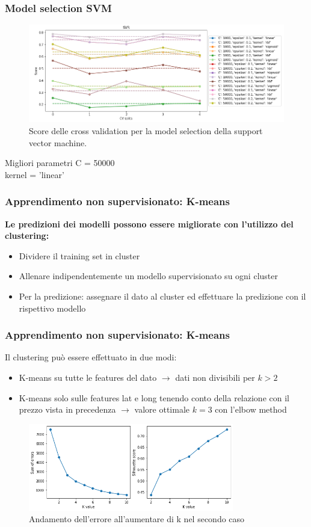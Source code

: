 \documentclass{beamer}
\begin{document}
\begin{frame}
	\frametitle{Model selection SVM}
	\begin{figure}[ht]
		\centering
		\includegraphics[width=\textwidth]{svmcv.png}
		\caption{Score delle cross validation per la model selection della support
		vector machine.}
	\end{figure}
	\begin{alertblock}{Migliori parametri}
		C = 50000\\
		kernel = 'linear'
	\end{alertblock}
\end{frame}

\begin{frame}
	\frametitle{Apprendimento non supervisionato: K-means}
	\textbf{Le predizioni dei modelli possono essere migliorate con l'utilizzo
	del clustering:}
	\begin{itemize}
		\item Dividere il training set in cluster
		\item Allenare indipendentemente un modello supervisionato su ogni cluster
		\item Per la predizione: assegnare il dato al cluster ed effettuare la
			predizione con il rispettivo modello
	\end{itemize}
\end{frame}

\begin{frame}
	\frametitle{Apprendimento non supervisionato: K-means}
	Il clustering può essere effettuato in due modi:
	\begin{itemize}
		\item K-means su tutte le features del dato $\rightarrow$ dati non 
			divisibili per $k > 2$
		\item K-means solo sulle features \alert{lat} e \alert{long} tenendo
			conto della relazione con il prezzo vista in precedenza
			$\rightarrow$ valore ottimale $k = 3$ con l'elbow method
	\end{itemize}
	\begin{figure}
		\centering
		\includegraphics[width=0.8\textwidth]{kselection2.png}
		\caption{Andamento dell'errore all'aumentare di k nel secondo caso}
	\end{figure}
\end{frame}
\end{document}

